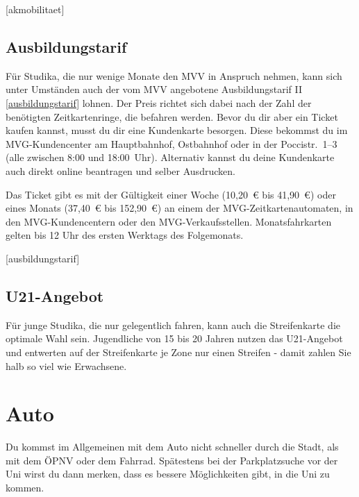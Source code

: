 \begin{urlList}
	[akmobilitaet]
\end{urlList}

\subsection*{Ausbildungstarif}
Für Studika, die nur wenige Monate den MVV in Anspruch nehmen, kann sich unter
Umständen auch der vom MVV angebotene Ausbildungstarif II
\ref{ausbildungstarif} lohnen. Der Preis richtet sich dabei nach der Zahl der
benötigten Zeitkartenringe, die befahren werden. Bevor du dir aber ein Ticket
kaufen kannst, musst du dir eine Kundenkarte besorgen. Diese bekommst du im
MVG-Kundencenter am Hauptbahnhof, Ostbahnhof oder in der \mbox{Poccistr.}~1--3 (alle
zwischen 8:00 und 18:00~Uhr). Alternativ kannst du deine Kundenkarte auch
direkt online beantragen und selber Ausdrucken.

Das Ticket gibt es mit der Gültigkeit einer Woche (10,20~€ bis 41,90~€) oder eines Monats (37,40~€ bis 152,90~€) an einem der MVG-Zeitkartenautomaten, in den MVG-Kundencentern oder den MVG-Verkaufsstellen. Monatsfahrkarten gelten bis 12 Uhr des ersten Werktags des Folgemonats.


\begin{urlList}
	[ausbildungstarif]
\end{urlList}

\subsection*{U21-Angebot}
Für junge Studika, die nur gelegentlich fahren, kann auch die Streifenkarte die optimale Wahl sein. Jugendliche von 15 bis 20 Jahren nutzen das U21-Angebot und entwerten auf der Streifenkarte je Zone nur einen Streifen - damit zahlen Sie halb so viel wie Erwachsene.

\section{Auto}
Du kommst im Allgemeinen mit dem Auto nicht schneller durch die Stadt, als mit dem ÖPNV oder dem Fahrrad. Spätestens bei der Parkplatzsuche vor der Uni wirst du dann merken, dass es bessere Möglichkeiten gibt, in die Uni zu kommen.
